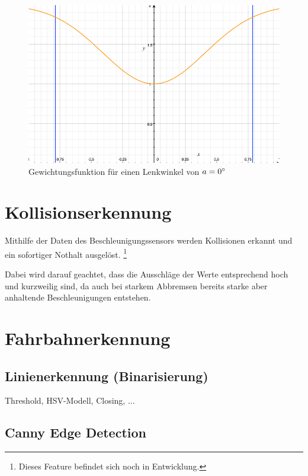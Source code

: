 \documentclass[a4paper,12pt]{report}
\begin{document}
	
	\begin{figure}
		\centering
		\includegraphics[width=\textwidth,height=\textheight,keepaspectratio]{assets/uss-function}
		\caption{Gewichtungsfunktion für einen Lenkwinkel von $a = 0\degree$}
		\label{img_uss_function}
	\end{figure}
	

\chapter{Kollisionserkennung}

	Mithilfe der Daten des Beschleunigungssensors werden Kollisionen erkannt und ein sofortiger Nothalt ausgelöst.
	\footnote{Dieses Feature befindet sich noch in Entwicklung.}
	
	Dabei wird darauf geachtet, dass die Ausschläge der Werte entsprechend hoch und kurzweilig sind, da auch bei starkem Abbremsen bereits starke aber anhaltende Beschleunigungen entstehen.
	

\chapter{Fahrbahnerkennung}

\section{Linienerkennung (Binarisierung)}
	Threshold, HSV-Modell, Closing, ...

\section{Canny Edge Detection} %
\end{document}
